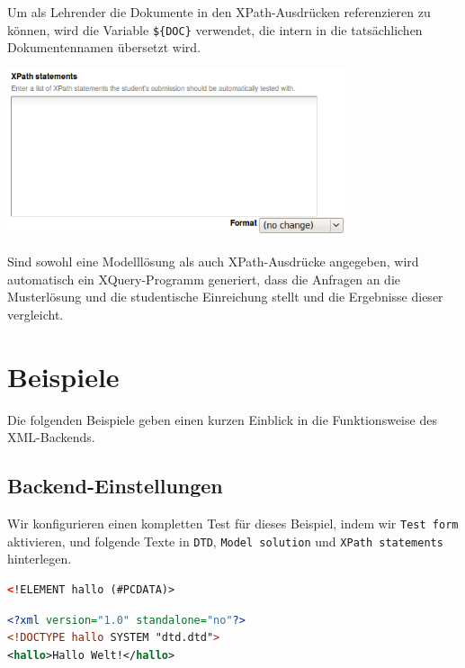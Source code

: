 \documentclass[a4paper]{scrartcl}
\newcommand{\anf}[1]{\glqq{}#1\grqq{}}
\begin{document}
      Um als Lehrender die Dokumente in den XPath-Ausdrücken referenzieren zu können, wird die Variable \anf{\texttt{\$\{DOC\}}} verwendet, die intern in die tatsächlichen Dokumentennamen übersetzt wird.

      \begin{center}
	      \includegraphics[width=0.75\textwidth]{images/XPath.png}
	      \label{fig:xpath}
      \end{center}
      Sind sowohl eine Modelllösung als auch XPath-Ausdrücke angegeben, wird automatisch ein XQuery-Programm generiert, dass die Anfragen an die Musterlösung und die studentische Einreichung stellt und die Ergebnisse dieser vergleicht.
  	  
	\section{Beispiele}
	  Die folgenden Beispiele geben einen kurzen Einblick in die Funktionsweise des XML-Backends.
	  \subsection{Backend-Einstellungen}
	  Wir konfigurieren einen kompletten Test für dieses Beispiel, indem wir \anf{\texttt{Test form}} aktivieren, und folgende Texte in \anf{\texttt{DTD}}, \anf{\texttt{Model solution}} und \anf{\texttt{XPath statements}} hinterlegen.
	  
\begin{lstlisting}[language=XML, captionpos=b, frame=tlRB, caption={Beispiel DTD.}]
<!ELEMENT hallo (#PCDATA)>
\end{lstlisting}

\begin{lstlisting}[language=XML, captionpos=b, frame=tlRB, caption=Modelllösung.]
<?xml version="1.0" standalone="no"?>
<!DOCTYPE hallo SYSTEM "dtd.dtd">
<hallo>Hallo Welt!</hallo>
\end{lstlisting}
\end{document}
